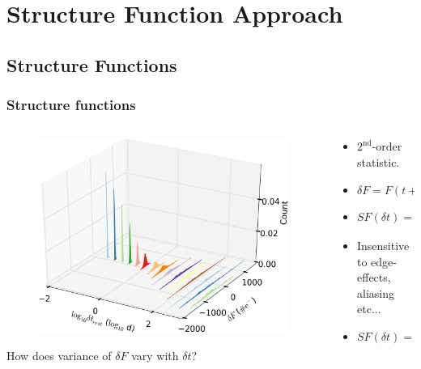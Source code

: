 \documentclass[hyperref={pdfpagelabels=false}]{beamer}
\begin{document}
\section{Structure Function Approach}

\subsection{Structure Functions}

\begin{frame}
\frametitle{Structure functions} 
  \begin{columns}
    \centering
    \begin{column}{0.6\textwidth}
      \begin{figure}
        \includegraphics[scale=0.0875]{images/kplr006932990-1stIncr_3D.jpg}
      \end{figure}
      \centering
      {\tiny How does variance of $\delta F$ vary with $\delta t$?}
    \end{column}
    \begin{column}{0.4\textwidth}
       \begin{itemize}
       \item $2^{\mathrm{nd}}$-order statistic.
       \item $\delta F = F(t+\delta t) - F(t)$
       \item $SF(\delta t) = \langle \vert \delta F \vert^{2} \rangle_{t}$
       \item Insensitive to edge-effects, aliasing etc...
       \item $SF(\delta t) = 2ACVF(0) - 2ACVF(\delta t)$
       \end{itemize}
    \end{column}
  \end{columns}
\end{frame}
\end{document}
